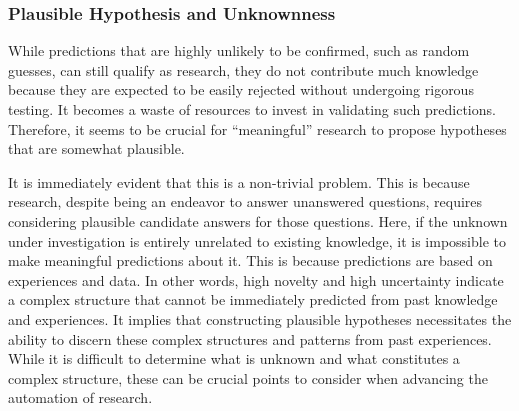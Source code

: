 \documentclass{book}
\begin{document}
\subsubsection{Plausible Hypothesis and Unknownness}

While predictions that are highly unlikely to be confirmed, such as random guesses, can still qualify as research, they do not contribute much knowledge because they are expected to be easily rejected without undergoing rigorous testing. It becomes a waste of resources to invest in validating such predictions. Therefore, it seems to be crucial for ``meaningful'' research to propose hypotheses that are somewhat plausible.

It is immediately evident that this is a non-trivial problem. This is because research, despite being an endeavor to answer unanswered questions, requires considering plausible candidate answers for those questions. Here, if the unknown under investigation is entirely unrelated to existing knowledge, it is impossible to make meaningful predictions about it. This is because predictions are based on experiences and data. In other words, high novelty and high uncertainty indicate a complex structure that cannot be immediately predicted from past knowledge and experiences. It implies that constructing plausible hypotheses necessitates the ability to discern these complex structures and patterns from past experiences. While it is difficult to determine what is unknown and what constitutes a complex structure, these can be crucial points to consider when advancing the automation of research.

\end{document}
